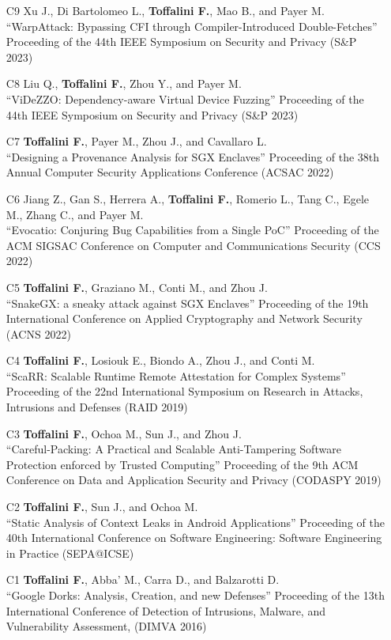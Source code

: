 \begin{enumerate}[leftmargin=5mm]
\item[C9] Xu J., Di Bartolomeo L., \textbf{Toffalini F.}, Mao B., and Payer M.\\``WarpAttack: Bypassing CFI through Compiler-Introduced Double-Fetches'' Proceeding of the 44th IEEE Symposium on Security and Privacy (S\&P 2023) 
\item[C8] Liu Q., \textbf{Toffalini F.}, Zhou Y., and Payer M.\\``ViDeZZO: Dependency-aware Virtual Device Fuzzing'' Proceeding of the 44th IEEE Symposium on Security and Privacy (S\&P 2023) 
\item[C7] \textbf{Toffalini F.}, Payer M., Zhou J., and Cavallaro L.\\``Designing a Provenance Analysis for SGX Enclaves'' Proceeding of the 38th Annual Computer Security Applications Conference (ACSAC 2022) 
\item[C6] Jiang Z., Gan S., Herrera A., \textbf{Toffalini F.}, Romerio L., Tang C., Egele M., Zhang C., and Payer M.\\``Evocatio: Conjuring Bug Capabilities from a Single PoC'' Proceeding of the ACM SIGSAC Conference on Computer and Communications Security (CCS 2022) 
\item[C5] \textbf{Toffalini F.}, Graziano M., Conti M., and Zhou J.\\``SnakeGX: a sneaky attack against SGX Enclaves'' Proceeding of the 19th International Conference on Applied Cryptography and Network Security (ACNS 2022) 
\item[C4] \textbf{Toffalini F.}, Losiouk E., Biondo A., Zhou J., and Conti M.\\``ScaRR: Scalable Runtime Remote Attestation for Complex Systems'' Proceeding of the 22nd International Symposium on Research in Attacks, Intrusions and Defenses (RAID 2019) 
\item[C3] \textbf{Toffalini F.}, Ochoa M., Sun J., and Zhou J.\\``Careful-Packing: A Practical and Scalable Anti-Tampering Software Protection enforced by Trusted Computing'' Proceeding of the 9th ACM Conference on Data and Application Security and Privacy (CODASPY 2019) 
\item[C2] \textbf{Toffalini F.}, Sun J., and Ochoa M.\\``Static Analysis of Context Leaks in Android Applications'' Proceeding of the 40th International Conference on Software Engineering: Software Engineering in Practice (SEPA@ICSE) 
\item[C1] \textbf{Toffalini F.}, Abba' M., Carra D., and Balzarotti D.\\``Google Dorks: Analysis, Creation, and new Defenses'' Proceeding of the 13th International Conference of Detection of Intrusions, Malware, and Vulnerability Assessment, (DIMVA 2016) 
\end{enumerate}
